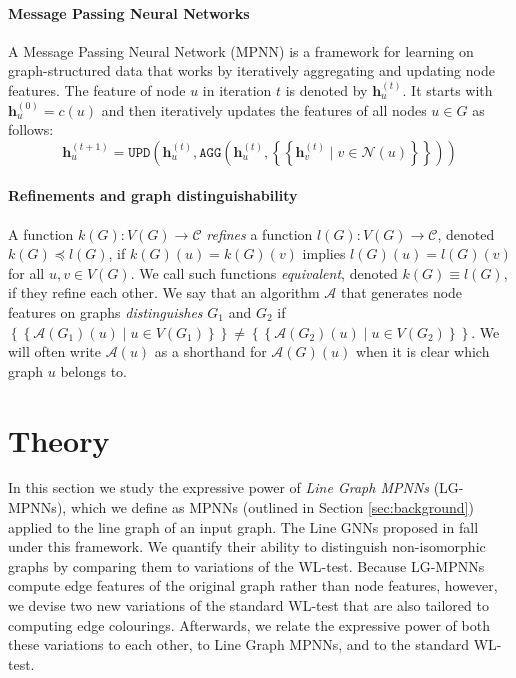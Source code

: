 \documentclass{article}
\newcommand{\multiset}[1]{\left\{\!\!\left\{#1\right\}\!\!\right\}}
\newcommand{\iter}[1]{^{(#1)}}
\newcommand{\upd}{\texttt{UPD}}
\newcommand{\agg}{\texttt{AGG}}
\newcommand{\nbh}{\mathcal{N}}
\newcommand{\bs}[1]{\boldsymbol{#1}}
\newcommand{\feat}{\bs{h}}
\newcommand{\mca}{\mathcal{A}}
\newcommand{\mcc}{\mathcal{C}}
\begin{document}
\paragraph{Message Passing Neural Networks}
A Message Passing Neural Network (MPNN) \cite{gilmer2017neural} is a framework for learning on graph-structured data that works by iteratively aggregating and updating node features. The feature of node $u$ in iteration $t$ is denoted by $\feat_u\iter{t}$. It starts with $\feat_u\iter{0} = c(u)$ and then iteratively updates the features of all nodes $u\in G$ as follows:
\begin{equation}
    \feat_u\iter{t+1}
    = \upd\left(\feat_u\iter{t},
    \agg\left(\feat_u\iter{t}, \multiset{\feat_v\iter{t} \mid v\in \nbh(u)}\right)\right)
\end{equation}

\paragraph{Refinements and graph distinguishability}
A function $k(G): V(G) \rightarrow \mcc$ \emph{refines} a function $l(G): V(G) \rightarrow \mcc$, denoted $k(G) \preceq l(G)$, if $k(G)(u) = k(G)(v)$ implies $l(G)(u) = l(G)(v)$ for all $u,v\in V(G)$. We call such functions \emph{equivalent}, denoted $k(G) \equiv l(G)$, if they refine each other.
We say that an algorithm $\mca$ that generates node features on graphs \emph{distinguishes} $G_1$ and $G_2$ if $\multiset{\mca(G_1)(u) \mid u\in V(G_1)} \neq \multiset{\mca(G_2)(u) \mid u\in V(G_2)}$. We will often write $\mca(u)$ as a shorthand for $\mca(G)(u)$ when it is clear which graph $u$ belongs to.




\section{Theory}    \label{sec:theory}


In this section we study the expressive power of \emph{Line Graph MPNNs} (LG-MPNNs), which we define as MPNNs (outlined in Section \ref{sec:background}) applied to the line graph of an input graph.
The Line GNNs proposed in \cite{cai2021line} fall under this framework.
We quantify their ability to distinguish non-isomorphic graphs by comparing them to variations of the WL-test.
Because LG-MPNNs compute edge features of the original graph rather than node features, however, we devise two new variations of the standard WL-test that are also tailored to computing edge colourings. 
Afterwards, we relate the expressive power of both these variations to each other, to Line Graph MPNNs, and to the standard WL-test.
\end{document}
